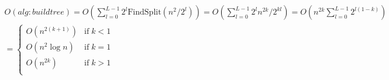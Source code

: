 %

\begin{multline}  %
    \label{eq:O_tree}
    O(alg:buildtree)
    = O\left(\sum_{l=0}^{L-1} 2^l \text{FindSplit}(n^2/2^l)\right)
    = O\left(\sum_{l=0}^{L-1} 2^l n^{2k}/2^{kl}\right)
    = O\left(n^{2k} \sum_{l=0}^{L-1} 2^{l(1-k)}\right)
    \\
    =
    \begin{cases}
        O(n^{2(k+1)}) & \text{if}\; k < 1\\
        O(n^2\log n) & \text{if}\; k = 1\\
        O(n^{2k}) & \text{if}\; k > 1\\
    \end{cases}
\end{multline}

